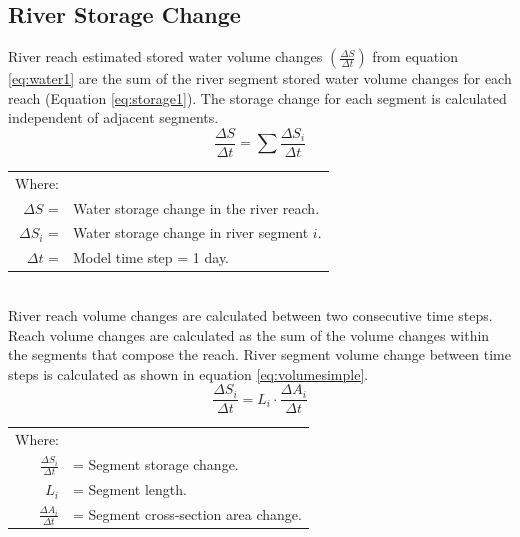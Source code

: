 \begin{linenumbers}
\clearpage{}
\section{River Storage Change}
\label{sec:RiverStorageChange}

River reach estimated stored water volume changes $( \frac{\Delta S}{\Delta t} ) $ from equation \ref{eq:water1} are the sum of the river segment stored water volume changes for each reach (Equation \ref{eq:storage1}).  The storage change for each segment is calculated independent of adjacent segments.
\begin{equation}
	\label{eq:storage1}
	\frac{\Delta S}{\Delta t} = \sum \frac{\Delta S_i}{\Delta t}
\end{equation}
\begin{tabular}{rl}
Where:\\
$\Delta S$ = & Water storage change in the river reach.\\
$\Delta S_i$ = & Water storage change in river segment $ i $.\\
$ \Delta t $ = & Model time step = 1 day. \\
\end{tabular}\\

River reach volume changes are calculated between two consecutive time steps.  Reach volume changes are calculated as the sum of the volume changes within the segments that compose the reach.  River segment volume change between time steps is calculated as shown in equation \ref{eq:volumesimple}.
\begin{equation}
	\frac{\Delta S_i}{\Delta t}=L_i \cdot \frac{\Delta A_i}{\Delta t}
	\label{eq:volumesimple}
\end{equation}
\begin{tabular}{r l}
	Where:&\\
	$\frac{\Delta S_i}{\Delta t}$ & = Segment storage change.\\
	$L_i$ & = Segment length.\\
	$\frac{\Delta A_i}{\Delta t} $ &= Segment cross-section area change.\\
\end{tabular}\\


\end{linenumbers}
